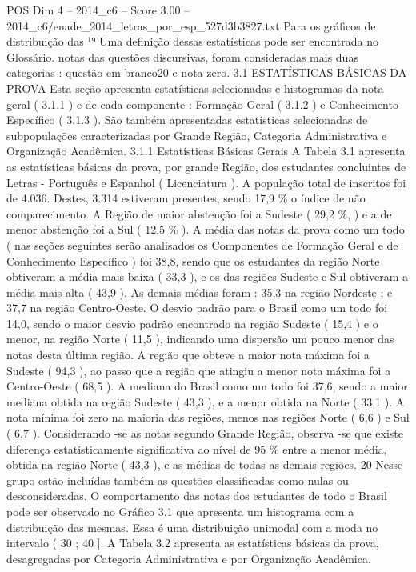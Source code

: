\begin{textsample}{POS Dim 4 – 2014\_c6 – Score 3.00 – 2014\_c6/enade\_2014\_letras\_por\_esp\_527d3b3827.txt}
Para os gráficos de distribuição das ¹⁹ Uma definição dessas estatísticas pode ser encontrada no Glossário. notas das questões discursivas, foram consideradas mais duas categorias : questão em branco20 e nota zero. 3.1 ESTATÍSTICAS BÁSICAS DA PROVA Esta seção apresenta estatísticas selecionadas e histogramas da nota geral ( 3.1.1 ) e de cada componente : Formação Geral ( 3.1.2 ) e Conhecimento Específico ( 3.1.3 ).
São também apresentadas estatísticas selecionadas de subpopulações caracterizadas por Grande Região, Categoria Administrativa e Organização Acadêmica. 3.1.1 Estatísticas Básicas Gerais A Tabela 3.1 apresenta as estatísticas básicas da prova, por grande Região, dos estudantes concluintes de Letras - Português e Espanhol ( Licenciatura ).
A população total de inscritos foi de 4.036.
Destes, 3.314 estiveram presentes, sendo 17,9 \% o índice de não comparecimento.
A Região de maior abstenção foi a Sudeste ( 29,2 \%, ) e a de menor abstenção foi a Sul ( 12,5 \% ).
A média das notas da prova como um todo ( nas seções seguintes serão analisados os Componentes de Formação Geral e de Conhecimento Específico ) foi 38,8, sendo que os estudantes da região Norte obtiveram a média mais baixa ( 33,3 ), e os das regiões Sudeste e Sul obtiveram a média mais alta ( 43,9 ).
As demais médias foram : 35,3 na região Nordeste ; e 37,7 na região Centro-Oeste.
O desvio padrão para o Brasil como um todo foi 14,0, sendo o maior desvio padrão encontrado na região Sudeste ( 15,4 ) e o menor, na região Norte ( 11,5 ), indicando uma dispersão um pouco menor das notas desta última região.
A região que obteve a maior nota máxima foi a Sudeste ( 94,3 ), ao passo que a região que atingiu a menor nota máxima foi a Centro-Oeste ( 68,5 ).
A mediana do Brasil como um todo foi 37,6, sendo a maior mediana obtida na região Sudeste ( 43,3 ), e a menor obtida na Norte ( 33,1 ).
A nota mínima foi zero na maioria das regiões, menos nas regiões Norte ( 6,6 ) e Sul ( 6,7 ).
Considerando -se as notas segundo Grande Região, observa -se que existe diferença estatisticamente significativa ao nível de 95 \% entre a menor média, obtida na região Norte ( 43,3 ), e as médias de todas as demais regiões. 20 Nesse grupo estão incluídas também as questões classificadas como nulas ou desconsideradas.
O comportamento das notas dos estudantes de todo o Brasil pode ser observado no Gráfico 3.1 que apresenta um histograma com a distribuição das mesmas.
Essa é uma distribuição unimodal com a moda no intervalo ( 30 ; 40 ].
A Tabela 3.2 apresenta as estatísticas básicas da prova, desagregadas por Categoria Administrativa e por Organização Acadêmica.

\end{textsample}
